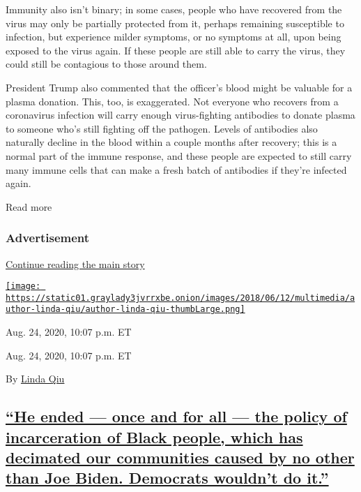 Immunity also isn't binary; in some cases, people who have recovered
from the virus may only be partially protected from it, perhaps
remaining susceptible to infection, but experience milder symptoms, or
no symptoms at all, upon being exposed to the virus again. If these
people are still able to carry the virus, they could still be contagious
to those around them.

President Trump also commented that the officer's blood might be
valuable for a plasma donation. This, too, is exaggerated. Not everyone
who recovers from a coronavirus infection will carry enough
virus-fighting antibodies to donate plasma to someone who's still
fighting off the pathogen. Levels of antibodies also naturally decline
in the blood within a couple months after recovery; this is a normal
part of the immune response, and these people are expected to still
carry many immune cells that can make a fresh batch of antibodies if
they're infected again.

Read more

\hypertarget{advertisement-4}{%
\subsubsection{Advertisement}\label{advertisement-4}}

\protect\hyperlink{after-dfp-ad-mid5}{Continue reading the main story}

\href{https://www.nytimes3xbfgragh.onion/by/linda-qiu}{\texttt{[image: https://static01.graylady3jvrrxbe.onion/images/2018/06/12/multimedia/author-linda-qiu/author-linda-qiu-thumbLarge.png]}}

Aug. 24, 2020, 10:07 p.m. ET

Aug. 24, 2020, 10:07 p.m. ET

By \href{https://www.nytimes3xbfgragh.onion/by/linda-qiu}{Linda Qiu}

\hypertarget{he-ended--once-and-for-all--the-policy-of-incarceration-of-black-people-which-has-decimated-our-communities-caused-by-no-other-than-joe-biden-democrats-wouldnt-do-it}{%
\subsection{\texorpdfstring{\protect\hyperlink{he-ended-once-and-for-all-the-policy-of-incarceration-of-black-people-which-has-decimated-our-communities-caused-by-no-other-tha}{``He
ended --- once and for all --- the policy of incarceration of Black
people, which has decimated our communities caused by no other than Joe
Biden. Democrats wouldn't do
it.''}}{``He ended --- once and for all --- the policy of incarceration of Black people, which has decimated our communities caused by no other than Joe Biden. Democrats wouldn't do it.''}}\label{he-ended--once-and-for-all--the-policy-of-incarceration-of-black-people-which-has-decimated-our-communities-caused-by-no-other-than-joe-biden-democrats-wouldnt-do-it}}

